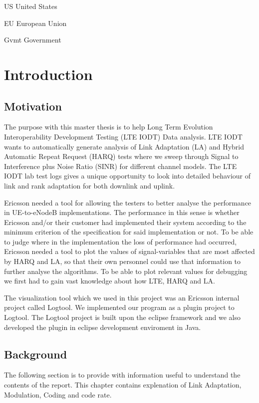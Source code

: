 \documentclass[cropmarks, frame, english]{idamasterthesis}
\author{Paul Nedstrand \& Razmus Lindgren}
\newcommand{\abbrlabel}[1]{\makebox[3cm][l]{\textbf{#1}\ \dotfill}}
\newenvironment{abbreviations}{\begin{list}{}{\renewcommand{\makelabel}{\abbrlabel}}}{\end{list}}
\begin{document}
\begin{abbreviations}
\item[US] United States
\item[EU] European Union
\item[Gvmt] Government
\end{abbreviations}


\makeintropages


\chapter{Introduction}

\section{Motivation}



The purpose with this master thesis is to help Long Term Evolution Interoperability Development Testing (LTE IODT) Data analysis. LTE IODT wants to automatically generate analysis of Link Adaptation (LA) and Hybrid Automatic Repeat Request (HARQ) tests where we sweep through Signal to Interference plus Noise Ratio (SINR) for different channel models. The LTE IODT lab test logs gives a unique opportunity to look into detailed behaviour of link and rank adaptation for both downlink and uplink. \newline


Ericsson needed a tool for allowing the testers to better analyse the performance in UE-to-eNodeB implementations. The performance in this sense is whether Ericsson and/or their customer had implemented their system according to the minimum criterion of the specification for said implementation or not. To be able to judge where in the implementation the loss of performance had occurred, Ericsson needed a tool to plot the values of signal-variables that are most affected by HARQ and LA, so that their own personnel could use that information to further analyse the algorithms. To be able to plot relevant values for debugging we first had to gain vast knowledge about how LTE, HARQ and LA. \newline


The visualization tool which we used in this project was an Ericsson internal project called Logtool. We implemented our program as a plugin project to Logtool. The Logtool project is built upon the eclipse framework and we also developed the plugin in eclipse development enviroment in Java. 
\section{Background}
The following section is to provide with information useful to understand the contents of the report. This chapter contains explenation of Link Adaptation, Modulation, Coding and code rate. 
\end{document}
